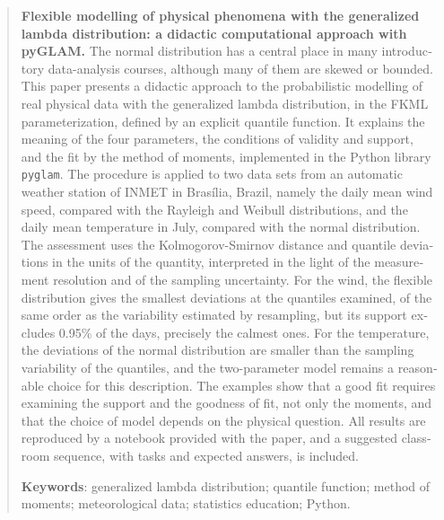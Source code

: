 \begin{otherlanguage}{english}
\begin{abstract}
\noindent\textbf{Flexible modelling of physical phenomena with the generalized lambda distribution: a didactic computational approach with pyGLAM.}
The normal distribution has a central place in many introductory data-analysis courses, although many of them are skewed or bounded. This paper presents a didactic approach to the probabilistic modelling of real physical data with the generalized lambda distribution, in the FKML parameterization, defined by an explicit quantile function. It explains the meaning of the four parameters, the conditions of validity and support, and the fit by the method of moments, implemented in the Python library \texttt{pyglam}. The procedure is applied to two data sets from an automatic weather station of INMET in Brasília, Brazil, namely the daily mean wind speed, compared with the Rayleigh and Weibull distributions, and the daily mean temperature in July, compared with the normal distribution. The assessment uses the Kolmogorov-Smirnov distance and quantile deviations in the units of the quantity, interpreted in the light of the measurement resolution and of the sampling uncertainty. For the wind, the flexible distribution gives the smallest deviations at the quantiles examined, of the same order as the variability estimated by resampling, but its support excludes 0.95\% of the days, precisely the calmest ones. For the temperature, the deviations of the normal distribution are smaller than the sampling variability of the quantiles, and the two-parameter model remains a reasonable choice for this description. The examples show that a good fit requires examining the support and the goodness of fit, not only the moments, and that the choice of model depends on the physical question. All results are reproduced by a notebook provided with the paper, and a suggested classroom sequence, with tasks and expected answers, is included.

\medskip
\noindent\textbf{Keywords}: generalized lambda distribution; quantile function; method of moments; meteorological data; statistics education; Python.
\end{abstract}
\end{otherlanguage}
